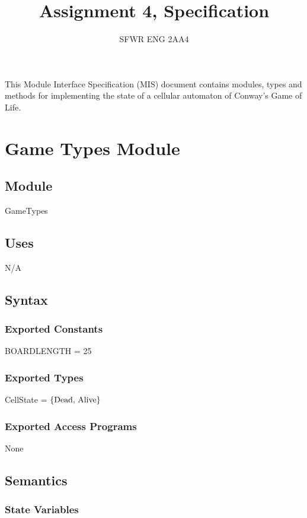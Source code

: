 \documentclass[12pt]{article}
\title{Assignment 4, Specification}
\author{SFWR ENG 2AA4}
\begin{document}
\maketitle
This Module Interface Specification (MIS) document contains modules, types and
methods for implementing the state of a cellular automaton of Conway's Game of Life.

\newpage

\section* {Game Types Module}

\subsection*{Module}

GameTypes

\subsection* {Uses}

N/A

\subsection* {Syntax}

\subsubsection* {Exported Constants}

BOARDLENGTH = 25

\subsubsection* {Exported Types}

CellState = $\{\text{Dead, Alive}\} \\ $

\subsubsection* {Exported Access Programs}

None

\subsection* {Semantics}

\subsubsection* {State Variables}
\end{document}
